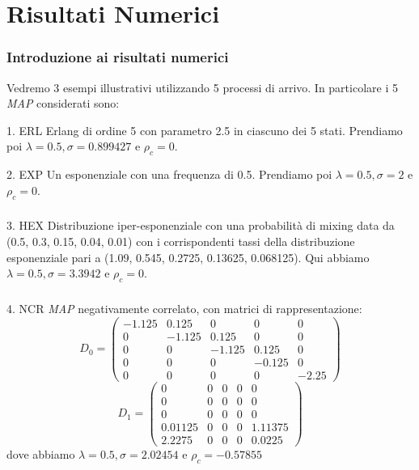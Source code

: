 \documentclass{beamer}
\begin{document}
\section{Risultati Numerici}
\begin{frame}
    \frametitle{Introduzione ai risultati numerici}
    Vedremo 3 esempi illustrativi utilizzando 5 processi di arrivo. In particolare i 5 \emph{MAP} considerati sono:
    \begin{block}{1. ERL}
        Erlang di ordine 5 con parametro 2.5 in ciascuno dei 5 stati. Prendiamo poi $\lambda = 0.5, \sigma = 0.899427$ e $\rho_c = 0$.
    \end{block}
    \begin{block}{2. EXP}
        Un esponenziale con una frequenza di 0.5. Prendiamo poi $\lambda = 0.5, \sigma = 2$ e $\rho_c = 0$.
    \end{block}
\end{frame}


\begin{frame}
    \frametitle{}
    \begin{block}{3. HEX}
        Distribuzione iper-esponenziale con una probabilità di mixing data da (0.5, 0.3, 0.15, 0.04, 0.01) con i corrispondenti tassi della distribuzione esponenziale pari a (1.09, 0.545, 0.2725, 0.13625, 0.068125). Qui abbiamo $\lambda = 0.5, \sigma = 3.3942$ e $\rho_c = 0$.
    \end{block}
\end{frame}


\begin{frame}
    \frametitle{}
    \begin{block}{4. NCR}
        \emph{MAP} negativamente correlato, con matrici di rappresentazione:
        \begin{equation*}
            D_0 =
            \begin{pmatrix}
                -1.125 & 0.125 & 0 & 0 & 0 \\
                0 & -1.125 & 0.125 & 0 & 0 \\
                0 & 0 & -1.125 & 0.125 & 0 \\
                0 & 0 & 0 & -0.125 & 0 \\
                0 & 0 & 0 & 0 & -2.25
            \end{pmatrix}
        \end{equation*}
        \begin{equation*}
            D_1 =
            \begin{pmatrix}
                0 & 0 & 0 & 0 & 0 \\
                0 & 0 & 0 & 0 & 0 \\
                0 & 0 & 0 & 0 & 0 \\
                0.01125 & 0 & 0 & 0 & 1.11375 \\
                2.2275 & 0 & 0 & 0 & 0.0225
            \end{pmatrix}
        \end{equation*}
        dove abbiamo $\lambda = 0.5, \sigma = 2.02454$ e $\rho_c =  -0.57855$
    \end{block}
\end{frame}
\end{document}
